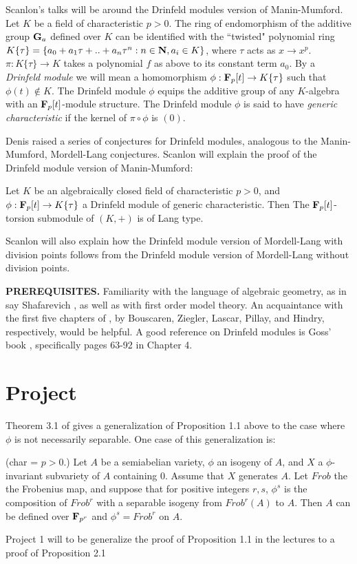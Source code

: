 \vspace{5mm}
\noindent
Scanlon's talks will be around the
Drinfeld modules version of
Manin-Mumford. Let
$K$ be a field of characteristic $p>0$. The
ring of endomorphism of the additive group
${\bf G}_{a}$ defined over $K$ can be
identified with the ``twisted" polynomial ring
$K\{\tau\} = \{a_{0} + a_{1}\tau + .. +
a_{n}\tau^{n}: n\in {\bf N}, a_{i}\in K\}$,
where
$\tau$ acts as
$x\rightarrow x^{p}$.
$\pi:K\{\tau\}\rightarrow K$ takes a polynomial
$f$ as above to its constant term $a_{0}$. By
a {\em Drinfeld module} we will mean a
homomorphism
$\phi:{\bf F}_{p}[t]\rightarrow K\{\tau\}$
such that $\phi(t)\notin K$. The Drinfeld
module $\phi$ equips the additive group of
any $K$-algebra with an ${\bf
F}_{p}[t]$-module structure. The Drinfeld
module
$\phi$ is said to have {\em generic
characteristic} if the kernel of
$\pi\circ\phi$ is $(0)$.

\vspace{2mm}
\noindent
Denis \cite{Denis} raised a series of
conjectures for Drinfeld modules, analogous to
the Manin-Mumford, Mordell-Lang conjectures.
Scanlon will explain the proof of the Drinfeld
module version of Manin-Mumford:
\begin{Proposition} Let $K$ be an algebraically
closed field of characteristic
$p>0$, and
$\phi:{\bf F}_{p}[t]\rightarrow K\{\tau\}$ a
Drinfeld module of generic characteristic. Then
The ${\bf F}_{p}[t]$-torsion submodule of
$(K,+)$ is of Lang type.
\end{Proposition}
Scanlon will also explain how the Drinfeld
module version of Mordell-Lang with division
points follows from the Drinfeld module
version of Mordell-Lang without division
points.


\vspace{5mm}
\noindent
{\bf PREREQUISITES.} Familiarity with the
language of algebraic geometry, as in say
Shafarevich \cite{Shafarevich}, as well as
with first order model theory. An acquaintance
with the first five  chapters of
\cite{Bouscaren}, by Bouscaren, Ziegler,
Lascar, Pillay, and Hindry, respectively,
would be helpful. A good reference on Drinfeld
modules is Goss' book \cite{Goss},
specifically pages 63-92 in Chapter 4.


\section{Project}
Theorem 3.1 of \cite{Pink-Roessler2} gives
a generalization of Proposition 1.1 above to
the case where $\phi$ is not necessarily
separable. One case of this generalization is:
\begin{Proposition} (char = $p > 0$.) Let $A$
be a semiabelian variety, $\phi$ an isogeny of
$A$, and $X$ a
$\phi$-invariant subvariety of $A$ containing
$0$. Assume that $X$ generates $A$. Let
$Frob$ the the Frobenius map, and suppose that
for positive integers
$r,s$,
$\phi^{s}$ is the composition of $Frob^{r}$
with a separable isogeny from $Frob^{r}(A)$ to
$A$. Then $A$ can be defined over ${\bf
F}_{p^{r}}$ and $\phi^{s} = Frob^{r}$ on $A$.
\end{Proposition}
Project 1 will to be generalize the proof of
Proposition 1.1 in the lectures to a proof of
Proposition 2.1

